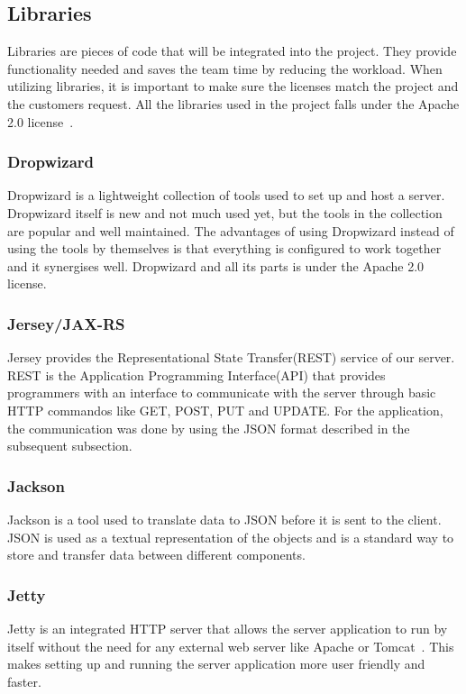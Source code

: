 \subsection{Libraries}
\label{sec:libraries}
Libraries are pieces of code that will be integrated into the project. They provide functionality needed and saves the team time by reducing the workload. 
When utilizing libraries, it is important to make sure the licenses match the project and the customers request. All the libraries used in the project falls under the Apache 2.0 license~\cite{Apache}.

\subsubsection{Dropwizard}
Dropwizard is a lightweight collection of tools used to set up and host a server. Dropwizard itself is new and not much used yet, but the tools in the collection are popular and well maintained. 
The advantages of using Dropwizard instead of using the tools by themselves is that everything is configured to work together and it synergises well.
Dropwizard and all its parts is under the Apache 2.0 license. 

\subsubsection{Jersey/JAX-RS}
Jersey provides the Representational State Transfer(REST) service of our server. REST is the Application Programming Interface(API) that provides programmers with an 
interface to communicate with the server through basic HTTP commandos like GET, POST, PUT and UPDATE. For the application, the communication was done by using the JSON format 
described in the subsequent subsection.

\subsubsection{Jackson}
Jackson is a tool used to translate data to JSON before it is sent to the client. JSON is used as a textual representation of the objects and is a standard way to store 
and transfer data between different components.

\subsubsection{Jetty}
Jetty is an integrated HTTP server that allows the server application to run by itself without the need for any external web server like Apache or Tomcat~\cite{tomcat}. 
This makes setting up and running the server application more user friendly and faster.

